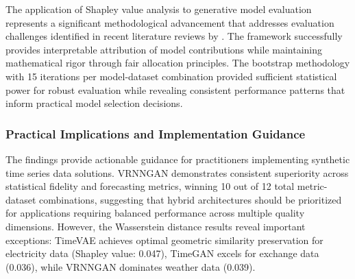 \documentclass{article}
\begin{document}
The application of Shapley value analysis to generative model evaluation represents a significant methodological advancement that addresses evaluation challenges identified in recent literature reviews by \textcite{goyal_systematic_2024}. The framework successfully provides interpretable attribution of model contributions while maintaining mathematical rigor through fair allocation principles. The bootstrap methodology with 15 iterations per model-dataset combination provided sufficient statistical power for robust evaluation while revealing consistent performance patterns that inform practical model selection decisions.

\subsubsection*{Practical Implications and Implementation Guidance}

The findings provide actionable guidance for practitioners implementing synthetic time series data solutions. VRNNGAN demonstrates consistent superiority across statistical fidelity and forecasting metrics, winning 10 out of 12 total metric-dataset combinations, suggesting that hybrid architectures should be prioritized for applications requiring balanced performance across multiple quality dimensions. However, the Wasserstein distance results reveal important exceptions: TimeVAE achieves optimal geometric similarity preservation for electricity data (Shapley value: 0.047), TimeGAN excels for exchange data (0.036), while VRNNGAN dominates weather data (0.039).



\end{document}
